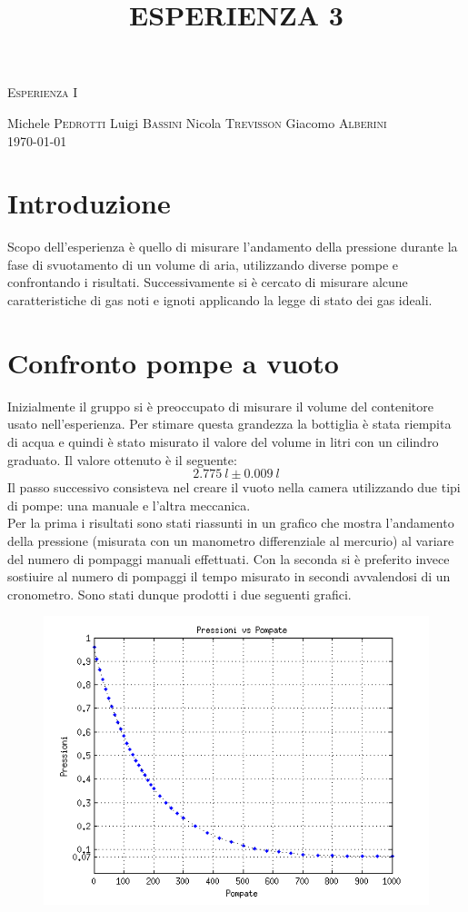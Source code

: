 \documentclass[a4paper,11pt]{article}
\begin{document}
\begin{center}
\textsc{\Huge Esperienza I}\\[0.5cm]
\large
\title{ESPERIENZA 3}

Michele \textsc{Pedrotti}
Luigi \textsc{Bassini}
Nicola \textsc{Trevisson}
Giacomo \textsc{Alberini}\\
\today
\end{center}

\section{Introduzione}
Scopo dell'esperienza è quello di misurare l'andamento della pressione durante la fase di svuotamento di un volume di aria, utilizzando diverse pompe e confrontando i risultati. Successivamente si è cercato di misurare alcune caratteristiche di gas noti e ignoti applicando la legge di stato dei gas ideali. 
\section{Confronto pompe a vuoto}

Inizialmente il gruppo si è preoccupato di misurare il volume del contenitore usato nell'esperienza. Per stimare questa grandezza la bottiglia è stata riempita di acqua e quindi è stato misurato il valore del volume in litri con un cilindro graduato. Il valore ottenuto è il seguente:
$$2.775  ~l\pm 0.009 ~l$$
Il passo successivo consisteva nel creare il vuoto nella camera utilizzando due tipi di pompe: una manuale e l'altra meccanica. \\
Per la prima i risultati sono stati riassunti in un grafico che mostra l'andamento della pressione (misurata con un manometro differenziale al mercurio) al variare del numero di pompaggi manuali effettuati. Con la seconda si è preferito invece sostiuire al numero di pompaggi il tempo misurato in secondi avvalendosi di un cronometro. Sono stati dunque prodotti i due seguenti grafici.
\\

\begin{figure}[htbp]
\centering
\includegraphics[width=15cm]{prexpomp.png}
\end{figure}
\end{document}
